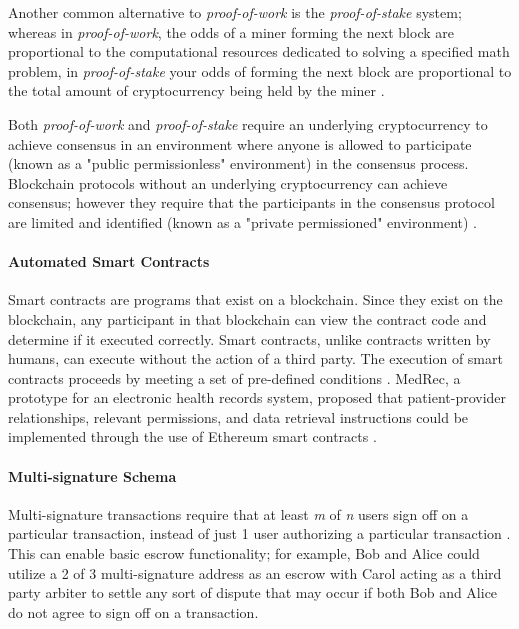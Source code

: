 \documentclass[12pt]{report}
\begin{document}
Another common alternative to \textit{proof-of-work} is the \textit{proof-of-stake} system; whereas in \textit{proof-of-work}, the odds of a miner forming the next block are proportional to the computational resources dedicated to solving a specified math problem, in \textit{proof-of-stake} your odds of forming the next block are proportional to the total amount of cryptocurrency being held by the miner \cite{Buterin.2014}.

Both \textit{proof-of-work} and \textit{proof-of-stake} require an underlying cryptocurrency to achieve consensus in an environment where anyone is allowed to participate (known as a "public permissionless" environment) in the consensus process. Blockchain protocols without an underlying cryptocurrency can achieve consensus; however they require that the participants in the consensus protocol are limited and identified (known as a "private permissioned" environment) \cite{hyperledger.}.

\paragraph{Automated Smart Contracts}
Smart contracts are programs that exist on a blockchain. Since they exist on the blockchain, any participant in that blockchain can view the contract code and determine if it executed correctly. Smart contracts, unlike contracts written by humans, can execute without the action of a third party. The execution of smart contracts proceeds by meeting a set of pre-defined conditions \cite{Atzei.2017}. MedRec, a prototype for an electronic health records system, proposed that patient-provider relationships, relevant permissions, and data retrieval instructions could be implemented through the use of Ethereum smart contracts \cite{Azaria.2016}.

\paragraph{Multi-signature Schema}
Multi-signature transactions require that at least \textit{m} of \textit{n} users sign off on a particular transaction, instead of just 1 user authorizing a particular transaction \cite{Goldfeder.2014}. This can enable basic escrow functionality; for example, Bob and Alice could utilize a 2 of 3 multi-signature address as an escrow with Carol acting as a third party arbiter to settle any sort of dispute that may occur if both Bob and Alice do not agree to sign off on a transaction.
\end{document}
